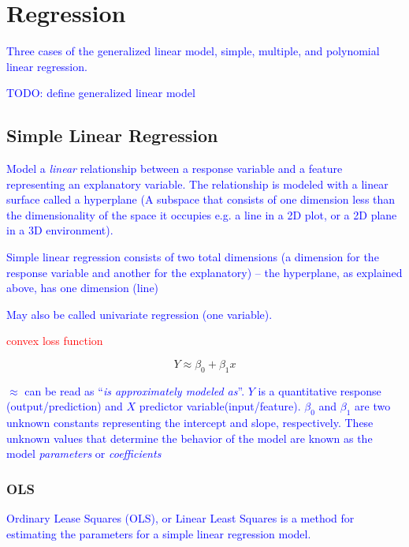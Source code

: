 \section{Regression}

\textcolor{blue}{Three cases of the {generalized linear model}, simple, multiple, and polynomial linear regression.}

\textcolor{blue}{TODO: define generalized linear model}

\subsection{Simple Linear Regression}

\textcolor{blue}{Model a \emph{linear} relationship between a response variable and a feature representing an explanatory variable. The relationship is modeled with a linear surface called a hyperplane (A subspace that consists of one dimension less than the dimensionality of the space it occupies e.g. a line in a 2D plot, or a 2D plane in a 3D environment).}

\textcolor{blue}{Simple linear regression consists of two total dimensions (a dimension for the response variable and another for the explanatory) -- the hyperplane, as explained above, has one dimension (line)}

\textcolor{blue}{May also be called univariate regression (one variable).}

\textcolor{red}{convex loss function}

\begin{equation}
{Y \approx \beta_0 + \beta_1 x}
\label{eq:slr_ex}
\end{equation}

\textcolor{blue}{$\approx$ can be read as ``\emph{is approximately modeled as}''. $Y$ is a quantitative response (output/prediction) and $X$ predictor variable(input/feature). $\beta_0$ and $\beta_1$ are two unknown constants representing the intercept and slope, respectively. These unknown values that determine the behavior of the model are known as the model \emph{parameters} or \emph{coefficients}}

\subsubsection{OLS}

\textcolor{blue}{{Ordinary Lease Squares (OLS)}, or {Linear Least Squares} is a method for estimating the parameters for a simple linear regression model.}

